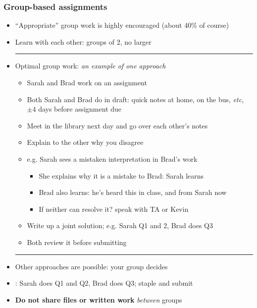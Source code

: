 \begin{frame}\frametitle{Group-based assignments}
	\begin{itemize}
		\item	``Appropriate'' group work is highly encouraged (about 40\% of course)
		\item	Learn with each other: groups of 2, no larger
		\vspace{2pt}\hrule\vspace{2pt}
		\item	Optimal group work: \emph{an example of one approach}
			\begin{itemize}
				\item	Sarah and Brad work on an assignment
				\item	Both Sarah and Brad do {} in draft: quick notes at home, on the bus, \emph{etc}, $\pm 4$ days before assignment due
				\pause
				\item	Meet in the library next day and go over each other's notes
				\item	Explain to the other why you disagree
				\item	e.g. Sarah sees a mistaken interpretation in Brad's work
				\begin{itemize}
					\item	She explains why it is a mistake to Brad: Sarah learns
					\item	Brad also learns: he's heard this in class, and from Sarah now
					\item	If neither can resolve it? speak with TA or Kevin					
				\end{itemize}
				\pause
				\item	Write up a joint solution; e.g. Sarah Q1 and 2, Brad does Q3
				\item	Both review it before submitting
			\end{itemize}
		\vspace{2pt}\hrule\vspace{2pt}
		\pause		
		\item	Other approaches are possible: your group decides
		\item	\color{myOrange}{What doesn't work}: Sarah does Q1 and Q2, Brad does Q3; staple and submit
		\item	\textbf{Do not share files or written work} \emph{between} groups 
	\end{itemize}
\end{frame}

